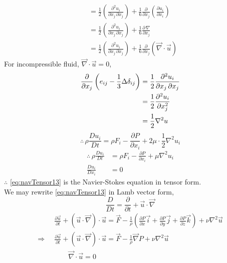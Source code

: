 \documentclass[../main-sheet.tex]{subfiles}
\begin{document}
\begin{soln}
\begin{align*}
        &=\frac{1}{2}\left( \frac{\partial^2 u_i}{\partial x_j\,\partial x_j} \right)+\frac{1}{6}\frac{\partial}{\partial x_j}(\frac{\partial u_i}{\partial x_i})\\
        &=\frac{1}{2}\left( \frac{\partial^2 u_i}{\partial x_j\,\partial x_j} \right)+\frac{1}{6}\frac{\partial\,\nabla}{\partial x_j}\\
        &=\frac{1}{2}\left( \frac{\partial^2 u_i}{\partial x_j\,\partial x_j} \right)+\frac{1}{6}\frac{\partial}{\partial x_j}(\vec{\nabla}\cdot\vec{u})
    \end{align*}
    For incompressible fluid, \(\vec{\nabla}\cdot\vec{u}=0\),
    \begin{align*}
        \frac{\partial }{\partial x_j}\left( e_{ij}-\frac{1}{3}\Delta \delta_{ij} \right)&=\frac{1}{2}\frac{\partial^2 u_i}{\partial x_j\,\partial x_j}\\
        &=\frac{1}{2} \frac{\partial^2 u_i}{\partial x_j^2}\\
        &=\frac{1}{2}\nabla^2u
    \end{align*}
    \[\therefore \, \rho \frac{D u_i}{D t}=\rho F_i-\frac{\partial P}{\partial x_i}+2\mu\cdot \frac{1}{2}\nabla^2u_i\]
    \begin{equation}
        \begin{aligned}
            \therefore \, \rho \frac{D u_i}{D t}&=\rho F_i-\frac{\partial P}{\partial x_i}+\mu\nabla^2u_i\\
            \frac{D u_i}{D x_i}&=0
        \end{aligned}
        \label{eq:navTensor13}
    \end{equation}
    \(\therefore\) \eqref{eq:navTensor13} is the Navier-Stokes equation in tensor form.\\
    We may rewrite \eqref{eq:navTensor13} in Lamb vector form,
    \[\frac{D}{D t}=\frac{\partial }{\partial t}+\vec{u}\cdot \vec{\nabla}\]
    \begin{align*}
        &\frac{\partial \vec{u}}{\partial t}+(\vec{u}\cdot \vec{\nabla})\cdot\vec{u}=\vec{F}-\frac{1}{\rho}\left( \frac{\partial P}{\partial x}\vec{i}+\frac{\partial P}{\partial y}\vec{j}+\frac{\partial P}{\partial z}\vec{k} \right)+\nu\nabla^2 \vec{u}\\
        \Rightarrow\;\;&\frac{\partial \vec{u}}{\partial t}+(\vec{u}\cdot \vec{\nabla})\cdot\vec{u}=\vec{F}-\frac{1}{\rho}\vec{\nabla}P+\nu\nabla^2 \vec{u}\\
        &\qquad\vec{\nabla}\cdot\vec{u}=0
    \end{align*}
\end{soln}
\end{document}

